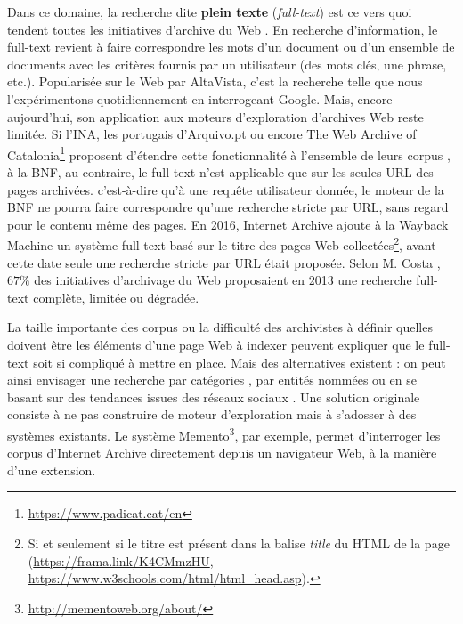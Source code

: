 \documentclass[symmetric,justified,marginals=raggedouter]{tufte-book}
\begin{document}
Dans ce domaine, la recherche dite \textbf{plein texte} (\textit{full-text}) est ce vers quoi tendent toutes les initiatives d'archive du Web \citep{costa_characterizing_2011,costa_evaluating_2012}. En recherche d'information, le full-text revient à faire correspondre les mots d'un document ou d'un ensemble de documents avec les critères fournis par un utilisateur (des mots clés, une phrase, etc.). Popularisée sur le Web par AltaVista, c'est la recherche telle que nous l'expérimentons quotidiennement en interrogeant Google. Mais, encore aujourd'hui, son application aux moteurs d'exploration d'archives Web reste limitée. Si l'INA, les portugais d'Arquivo.pt ou encore The Web Archive of Catalonia\footnote{\RaggedOuter \url{https://www.padicat.cat/en}} proposent d'étendre cette fonctionnalité à l'ensemble de leurs corpus \citep{stack_full_2006}, à la BNF, au contraire, le full-text n'est applicable que sur les seules URL des pages archivées. c'est-à-dire qu'à une requête utilisateur donnée, le moteur de la BNF ne pourra faire correspondre qu'une recherche stricte par URL, sans regard pour le contenu même des pages. En 2016, Internet Archive ajoute à la Wayback Machine un système full-text basé sur le titre des pages Web collectées\footnote{\RaggedOuter Si et seulement si le titre est présent dans la balise \textit{title} du HTML de la page (\url{https://frama.link/K4CMmzHU}, \url{https://www.w3schools.com/html/html_head.asp}).}, avant cette date seule une recherche stricte par URL était proposée. Selon M. Costa \citep{costa_survey_2013}, $67\%$ des initiatives d'archivage du Web proposaient en 2013 une recherche full-text complète, limitée ou dégradée. 

La taille importante des corpus ou la difficulté des archivistes à définir quelles doivent être les éléments d'une page Web à indexer peuvent expliquer que le full-text soit si compliqué à mettre en place. Mais des alternatives existent : on peut ainsi envisager une recherche par catégories \citep{holzmann_tempas:_2016}, par entités nommées \citep{spaniol_tracking_2012} ou en se basant sur des tendances issues des réseaux sociaux \citep{risse_arcomem_2014}. Une solution originale consiste à ne pas construire de moteur d'exploration mais à s'adosser à des systèmes existants. Le système Memento\footnote{\RaggedOuter \url{http://mementoweb.org/about/}}, par exemple, permet d'interroger les corpus d'Internet Archive directement depuis un navigateur Web, à la manière d'une extension. 
\end{document}
